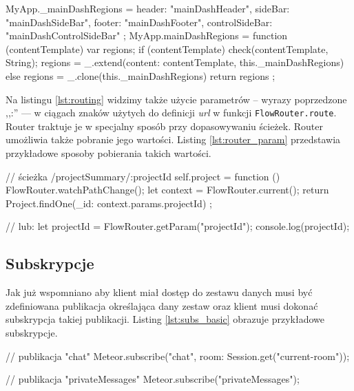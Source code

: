 \begin{js}[caption={Funkcja pomocnicza --- definicja regionów},label={lst:regions}]
MyApp._mainDashRegions = {
    header: "mainDashHeader",
    sideBar: "mainDashSideBar",
    footer: "mainDashFooter",
    controlSideBar: "mainDashControlSideBar"
};
MyApp.mainDashRegions = function (contentTemplate) {
    var regions;
    if (contentTemplate) {
        check(contentTemplate, String);
        regions = _.extend({content: contentTemplate}, this._mainDashRegions)
    } else {
        regions = _.clone(this._mainDashRegions)
    }
    return regions
};
\end{js}

Na listingu \ref{lst:routing} widzimy także użycie parametrów -- wyrazy poprzedzone ,,:'' --- w ciągach znaków użytych do definicji \textit{url} w funkcji \verb|FlowRouter.route|. Router traktuje je w specjalny sposób przy dopasowywaniu ścieżek. Router umożliwia także pobranie jego wartości. Listing \ref{lst:router_param} przedstawia przykładowe sposoby pobierania takich wartości.
\begin{js}[caption={Pobieranie parametrów z routera},label={lst:router_param}]
// ścieżka /projectSummary/:projectId
self.project = function () {
    FlowRouter.watchPathChange();
    let context = FlowRouter.current();
    return Project.findOne({_id: context.params.projectId})
};

// lub:
let projectId = FlowRouter.getParam("projectId");
console.log(projectId);
\end{js}

  \subsection{Subskrypcje}
Jak już wspomniano aby klient miał dostęp do zestawu danych musi być zdefiniowana publikacja określająca dany zestaw oraz klient musi dokonać subskrypcja takiej publikacji. Listing \ref{lst:subs_basic} obrazuje przykładowe subskrypcje.
\begin{js}[caption={Podstawowe subskrypcje},label={lst:subs_basic}]
// publikacja "chat"
Meteor.subscribe("chat", {room: Session.get("current-room")});

// publikacja "privateMessages"
Meteor.subscribe("privateMessages");
\end{js}

